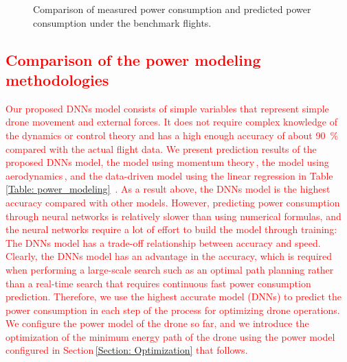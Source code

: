 \documentclass[journal]{./template/IEEEtran}
\begin{document}
\begin{figure}[h]
\caption{Comparison of measured power consumption and predicted power consumption under the benchmark flights.}

\label{fig: benchmark}
\end{figure}

\subsection{\textcolor{red}{Comparison of the power modeling methodologies}}

\textcolor{red}{Our proposed DNNs model consists of simple variables that represent simple drone movement and external forces. It does not require complex knowledge of the dynamics or control theory and has a high enough accuracy of about 90~\% compared with the actual flight data.}
\textcolor{red}{We present prediction results of the proposed DNNs model, the model using momentum theory\,\cite{ref_4}, the model using aerodynamics\,\cite{ref_3}, and the data-driven model using the linear regression in Table\,\ref{Table: power_modeling}~\cite{ref_8}.
As a result above, the DNNs model is the highest accuracy compared with other models.
However, predicting power consumption through neural networks is relatively slower than using numerical formulas, and the neural networks require a lot of effort to build the model through training: The DNNs model has a trade-off relationship between accuracy and speed.
Clearly, the DNNs model has an advantage in the accuracy, which is required when performing a large-scale search such as an optimal path planning rather than a real-time search that requires continuous fast power consumption prediction.
Therefore, we use the highest accurate model (DNNs) to predict the power consumption in each step of the process for optimizing drone operations.
We configure the power model of the drone so far, and we introduce the optimization of the minimum energy path of the drone using the power model configured in Section\,\ref{Section: Optimization} that follows.}
\end{document}
